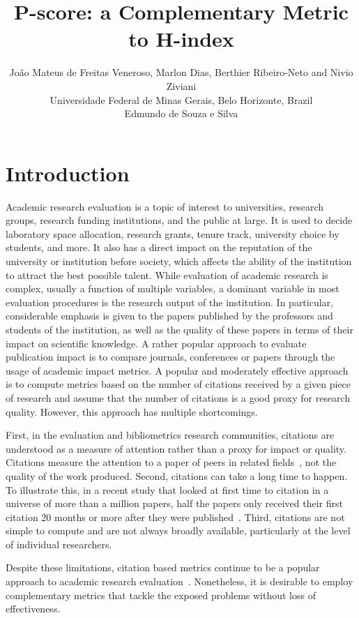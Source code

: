 \documentclass[man,floatsintext]{apa6}
\title{P-score: a Complementary Metric to H-index}
\author{
João Mateus de Freitas Veneroso, Marlon Dias, Berthier Ribeiro-Neto and Nivio Ziviani \\
Universidade Federal de Minas Gerais, Belo Horizonte, Brazil
\\
Edmundo de Souza e Silva 
}
\affiliation{Universidade Federal do Rio de Janeiro, Rio de Janeiro, Brazil}
\let \cite \parencite
\begin{document}
\setlength{\parindent}{40pt}

\maketitle

\section{Introduction}
\label{sec:introduction}

Academic research evaluation is a topic of interest to universities, research groups,
research funding institutions, and the public at large. It is used to decide laboratory space
allocation, research grants, tenure track, university choice by students, and more. It also 
has a direct impact on the reputation of the university or institution before society, which
affects the ability of the institution to attract the best possible talent. While evaluation of
academic research is complex, usually a function of multiple variables, a dominant variable in
most evaluation procedures is the research output of the institution. In particular, considerable
emphasis is given to the papers published by the professors and students of the institution, as
well as the quality of these papers in terms of their impact on scientific knowledge. A rather
popular approach to evaluate publication impact is to compare journals, conferences or papers
through the usage of academic impact metrics. A popular and moderately effective approach is to
compute metrics based on the number of citations received by a given piece of research and
assume that the number of citations is a good proxy for research quality. However,
this approach has multiple shortcomings. 

First, in the evaluation and bibliometrics research communities, citations are understood
as a measure of attention rather than a proxy for impact or quality. Citations measure 
the attention to a paper of peers in related fields~\cite{Loach2015}, not the quality of the 
work produced. Second, citations can take a long time to happen. To illustrate this, in a recent
study that looked at first time to citation in a universe of more than a million papers, half the 
papers only received their first citation 20 months or more after they were
published~\cite{Nane2012}. Third, citations are not simple to compute and are not always broadly
available, particularly at the level of individual researchers.

Despite these limitations, citation based metrics continue to be a popular approach to
academic research evaluation~\cite{Kellner2008}.
Nonetheless, it is desirable to employ
complementary metrics that tackle the exposed problems without loss of effectiveness.
\end{document}
